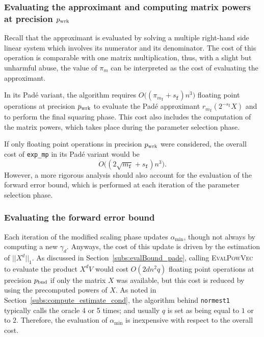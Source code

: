 \subsubsection{Evaluating the approximant and computing matrix powers at precision \texorpdfstring{$p_{\textup{wrk}}$}{p_wrk}}
Recall that the approximant is evaluated by solving a multiple right-hand side linear system which involves its numerator and its denominator. The cost of this operation is comparable with one matrix multiplication, thus, with a slight but unharmful abuse, the value of $\pi_m$ can be interpreted as the cost of evaluating the approximant.

In its Padé variant, the algorithm requires $O\big((\pi_{m_{\mathtt{f}}} + s_{\mathtt{f}}) n^3)$ floating point operations at precision $p_{\textup{wrk}}$ to evaluate the Padé approximant $r_{m_{\mathtt{f}}}(2^{-s_{\mathtt{f}}}X)$ and to perform the final squaring phase. This cost also includes the computation of the matrix powers, which takes place during the parameter selection phase.

If only floating point operations in precision $p_{\textup{wrk}}$ were considered, the overall cost of \texttt{exp\_mp} in its Padé variant would be 
\[
	O\big((2\sqrt{m_{\mathtt{f}}}+s_{\mathtt{f}})n^3\big).
\] 
However, a more rigorous analysis should also account for the evaluation of the forward error bound, which is performed at each iteration of the parameter selection phase.

\subsubsection{Evaluating the forward error bound}
Each iteration of the modified scaling phase updates $\alpha_{\min}$, though not always by computing a new $\gamma_d$. Anyways, the cost of this update is driven by the estimation of $\lvert\lvert{X^d}\rvert\rvert_1$.	
As discussed in Section~\ref{subs:evalBound_pade}, calling \textsc{EvalPowVec} to evaluate the product $X^dV$ would cost $O(2dn^2q)$ floating point operations at precision $p_{\textup{bnd}}$ if only the matrix $X$ was available, but this cost is reduced by using the precomputed powers of $X$. As noted in Section~\ref{subs:compute_estimate_cond}, the algorithm behind \texttt{normest1}~\cite[Alg.~3.21]{higham:matfun_book} typically calls the oracle 4 or 5 times; and usually $q$ is set as being equal to $1$ or to $2$. Therefore, the evaluation of $\alpha_{\min}$ is inexpensive with respect to the overall cost.

